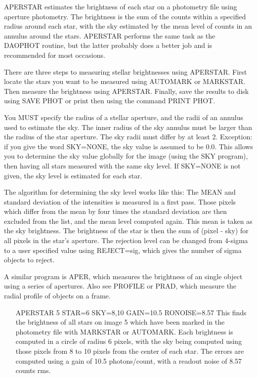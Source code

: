 APERSTAR estimates the brightness of each star on a photometry file using
aperture photometry.  The brightness is the sum of the counts within a
specified radius around each star, with the sky estimated by the mean level
of counts in an annulus around the stars. APERSTAR performs the same task
as the DAOPHOT 
 routine, 
but the latter probably does a better
job and is recommended for most occasions.

There are three steps to measuring stellar brightnesses using
APERSTAR. First locate the stars you want to be measured using AUTOMARK or
MARKSTAR.  Then measure the brightness using APERSTAR.  Finally, save the
results to disk using SAVE PHOT or print then using the command PRINT PHOT.

You MUST specify the radius of a stellar aperture, and the radii of an
annulus used to estimate the sky.  The inner radius of the sky annulus must
be larger than the radius of the star aperture. The sky radii must differ
by at least 2.  Exception: if you give the word SKY=NONE, the sky value is
assumed to be 0.0.  This allows you to determine the sky value globally for
the image (using the SKY program), then having all stars measured with the
same sky level. If SKY=NONE is not given, the sky level is estimated for
each star.

The algorithm for determining the sky level works like this: The MEAN and
standard deviation of the intensities is measured in a first pass. Those
pixels which differ from the mean by four times the standard deviation are
then excluded from the list, and the mean level computed again.  This mean
is taken as the sky brightness.  The brightness of the star is then the sum
of (pixel - sky) for all pixels in the star's aperture.  The rejection
level can be changed from 4-sigma to a user specified value using
REJECT=sig, which gives the number of sigma objects to reject.

A similar program is APER, which measures the brightness of an single
object using a series of apertures.  Also see PROFILE or PRAD, which
measure the radial profile of objects on a frame.

\begin{itemize}
  \item[APERSTAR 5 STAR=6 SKY=8,10 GAIN=10.5 RONOISE=8.57\hfill]{
This finds the brightness of all stars on image 5 which
have been marked in the photometry file with MARKSTAR 
or AUTOMARK.  Each brightness is computed in a circle of
radius 6 pixels, with the sky being computed using those
pixels from 8 to 10 pixels from the center of each star.
The errors are computed using a gain of 10.5 photons/count,
with a readout noise of 8.57 counts rms.}
\end{itemize}

